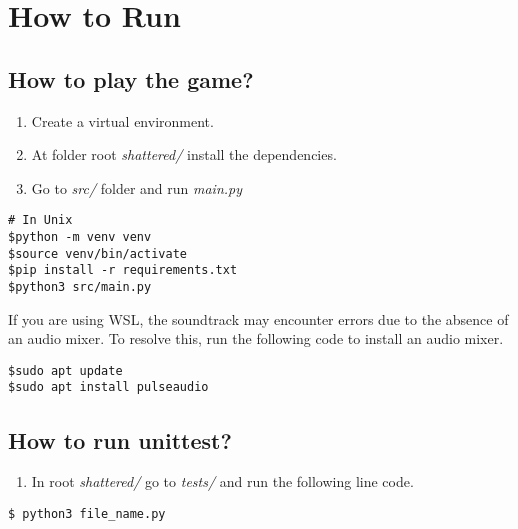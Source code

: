 \section{How to Run}

\subsection{How to play the game?}

\begin{enumerate}[label=\textbullet]
  \item Create a virtual environment.
  

  \item At folder root \textit{shattered/} install the dependencies.

  \item Go to \textit{src/} folder and run \textit{main.py}

\end{enumerate}


  \begin{verbatim}
# In Unix
$python -m venv venv
$source venv/bin/activate
$pip install -r requirements.txt 
$python3 src/main.py
\end{verbatim}

If you are using WSL, the soundtrack may encounter errors due to the absence of an audio mixer. To resolve this, run the following code to install an audio mixer.

\begin{verbatim}
$sudo apt update
$sudo apt install pulseaudio
\end{verbatim}

\subsection{How to run unittest?}

\begin{enumerate}[label=\textbullet]
    \item In root \textit{shattered/} go to \textit{tests/} and run the following line code.
    
\end{enumerate}

\begin{verbatim}
$ python3 file_name.py
\end{verbatim}